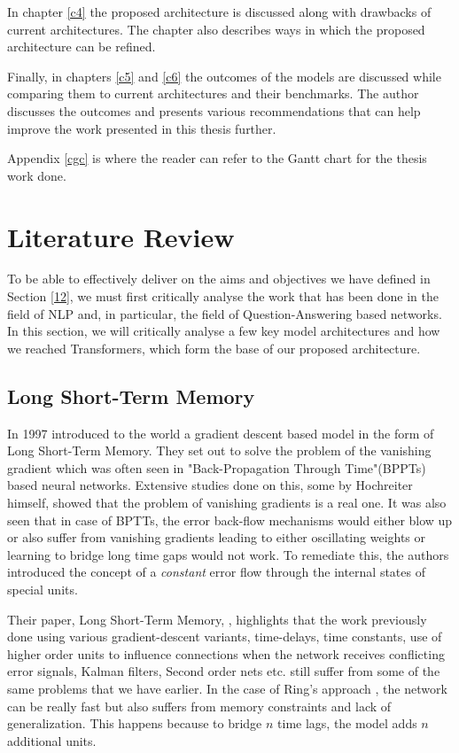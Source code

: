 \documentclass[a4paper,12pt]{report}
\begin{document}
        In chapter \ref{c4} the proposed architecture is discussed along with drawbacks of current architectures. The chapter also describes ways in which the proposed architecture can be refined.

        Finally, in chapters \ref{c5} and \ref{c6} the outcomes of the models are discussed while comparing them to current architectures and their benchmarks. The author discusses the outcomes and presents various recommendations that can help improve the work presented in this thesis further.

        Appendix \ref{cgc} is where the reader can refer to the Gantt chart for the thesis work done.

    \chapter{Literature Review}\label{c2litrev}

    To be able to effectively deliver on the aims and objectives we have defined in Section \ref{12}, we must first critically analyse the work that has been done in the field of NLP and, in particular, the field of Question-Answering based networks. In this section, we will critically analyse a few key model architectures and how we reached Transformers, which form the base of our proposed architecture.



        \section{Long Short-Term Memory}\label{22}

            In 1997 \citep{lstmoriginal} introduced to the world a gradient descent based model in the form of Long Short-Term Memory. They set out to solve the problem of the vanishing gradient which was often seen in "Back-Propagation Through Time"(BPPTs) based neural networks. Extensive studies done on this, some by Hochreiter himself, showed that the problem of vanishing gradients is a real one. It was also seen that in case of BPTTs, the error back-flow mechanisms would either blow up or also suffer from vanishing gradients leading to either oscillating weights or learning to bridge long time gaps would not work. To remediate this, the authors introduced the concept of a \textit{constant} error flow through the internal states of special units.

            Their paper, Long Short-Term Memory, \citep{lstmoriginal}, highlights that the work previously done using various gradient-descent variants, time-delays, time constants, use of higher order units to influence connections when the network receives conflicting error signals, Kalman filters, Second order nets etc. still suffer from some of the same problems that we have earlier. In the case of Ring's approach \citep{lstmRing}, the network can be really fast but also suffers from memory constraints and lack of generalization. This happens because to bridge $ n $ time lags, the model adds $ n $ additional units.
\end{document}
